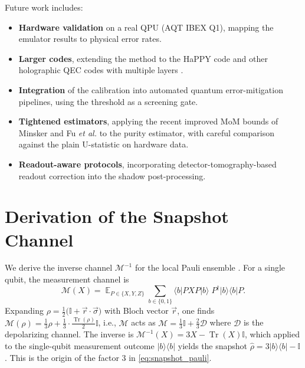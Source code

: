 \documentclass[12pt,a4paper,oneside]{book}
\theoremstyle{plain}
\theoremstyle{definition}
\theoremstyle{remark}
\DeclareMathOperator{\E}{\mathbb{E}}
\begin{document}
Future work includes:
\begin{itemize}[itemsep=2pt]
    \item \textbf{Hardware validation} on a real QPU (AQT IBEX Q1), mapping the emulator results to physical error rates.
    \item \textbf{Larger codes}, extending the method to the HaPPY code and other holographic QEC codes with multiple layers \cite{pastawski2015holographic}.
    \item \textbf{Integration} of the calibration into automated quantum error-mitigation pipelines, using the threshold as a screening gate.
    \item \textbf{Tightened estimators}, applying the recent improved MoM bounds of Minsker \cite{minsker2023efficient} and Fu \textit{et al.} \cite{fu2025classical} to the purity estimator, with careful comparison against the plain U-statistic on hardware data.
    \item \textbf{Readout-aware protocols}, incorporating detector-tomography-based readout correction \cite{maciejewski2020mitigation} into the shadow post-processing.
\end{itemize}

\appendix

\chapter{Derivation of the Snapshot Channel}
\label{app:snapshot}

We derive the inverse channel $\mathcal{M}^{-1}$ for the local Pauli ensemble \cite{huang2020predicting}. For a single qubit, the measurement channel is
\begin{equation}
    \mathcal{M}(X) = \E_{P \in \{X,Y,Z\}} \sum_{b \in \{0,1\}} \langle b| P X P |b\rangle \; P^\dagger |b\rangle\langle b| P.
\end{equation}
Expanding $\rho = \frac12\bigl(\mathbb{I} + \vec{r} \cdot \vec{\sigma}\bigr)$ with Bloch vector $\vec{r}$, one finds $\mathcal{M}(\rho) = \frac13 \rho + \frac13 \cdot \frac{\operatorname{Tr}(\rho)}{2} \mathbb{I}$, i.e., $\mathcal{M}$ acts as $\mathcal{M} = \frac13 \mathbb{I} + \frac23 \mathcal{D}$ where $\mathcal{D}$ is the depolarizing channel. The inverse is $\mathcal{M}^{-1}(X) = 3X - \operatorname{Tr}(X)\mathbb{I}$, which applied to the single-qubit measurement outcome $|b\rangle\langle b|$ yields the snapshot $\hat{\rho} = 3|b\rangle\langle b| - \mathbb{I}$. This is the origin of the factor $3$ in \cref{eq:snapshot_pauli}.
\end{document}
